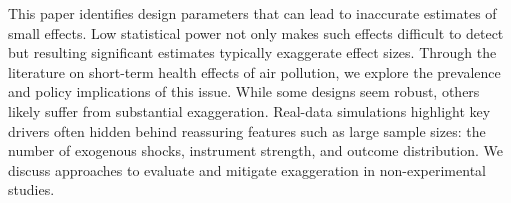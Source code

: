This paper identifies design parameters that can lead to inaccurate estimates of small effects. Low statistical power not only makes such effects difficult to detect but resulting significant estimates typically exaggerate effect sizes. Through the literature on short-term health effects of air pollution, we explore the prevalence and policy implications of this issue. While some designs seem robust, others likely suffer from substantial exaggeration. Real-data simulations highlight key drivers often hidden behind reassuring features such as large sample sizes: the number of exogenous shocks, instrument strength, and outcome distribution. We discuss approaches to evaluate and mitigate exaggeration in non-experimental studies.